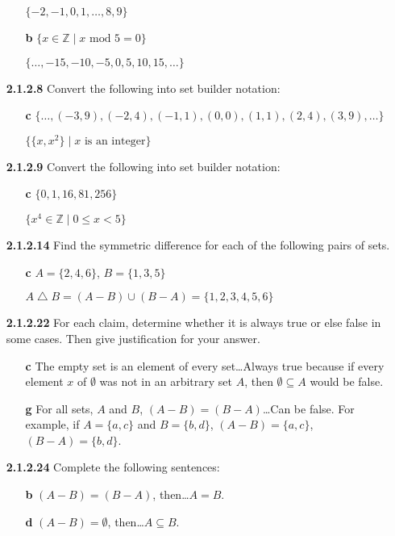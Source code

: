 \documentclass[10pt, a4paper]{article}
\begin{document}
\begin{itemize}
\begin{itemize}
            $\{-2,-1,0,1,\dots,8,9\}$
          \item[\textbf{b}] $ \{ x \in \mathbb{Z} \mid x \text{ mod } 5 = 0 \} $

            $\{{\dots,-15,-10,-5,0,5,10,15,\dots}\}$
    \end{itemize}

  \item[\textbf{2.1.2.8}] Convert the following into set builder notation:
    \begin{itemize}
      \item[\textbf{c}] $\{\dots,(-3,9),(-2,4),(-1,1),(0,0),(1,1),(2,4),(3,9),\dots\}$
        
        $\{ \{x,x^2\} \mid x \textrm{ is an integer}\}$
    \end{itemize}
  \item[\textbf{2.1.2.9}] Convert the following into set builder notation:
    \begin{itemize}
      \item[\textbf{c}] $\{0,1,16,81,256\}$

        $\{ x^4 \in \mathbb{Z} \mid 0 \leq x < 5\}$
    \end{itemize}

  \item[\textbf{2.1.2.14}] Find the symmetric difference for each of the following pairs of sets.
    \begin{itemize}
      \item[\textbf{c}] $A = \{2,4,6\}$, $B = \{1,3,5\}$

        $A \bigtriangleup B = (A - B) \cup (B - A) = \{1,2,3,4,5,6\}$
    \end{itemize}

  \item[\textbf{2.1.2.22}] For each claim, determine whether it is always true or else false in some cases.
    Then give justification for your answer.
    \begin{itemize}
      \item[\textbf{c}] The empty set is an element of every set\dots Always true because if every element $x$ of
        $\emptyset$ was not in an arbitrary set $A$, then $\emptyset \subseteq A$ would be false.
      \item[\textbf{g}] For all sets, $A$ and $B$, $(A-B) = (B-A)$\dots Can be false. For example, if $A = \{a,c\}$
        and $B = \{b,d\}$, $(A-B) = \{ a,c\}$, $(B-A) = \{b,d\}$.
    \end{itemize}

  \item[\textbf{2.1.2.24}] Complete the following sentences:
    \begin{itemize}
      \item[\textbf{b}] $(A-B) = (B-A)$, then\dots $A=B$.
      \item[\textbf{d}] $(A-B) = \emptyset$, then\dots $A \subseteq B$.
    \end{itemize}


\end{itemize}
\end{document}

